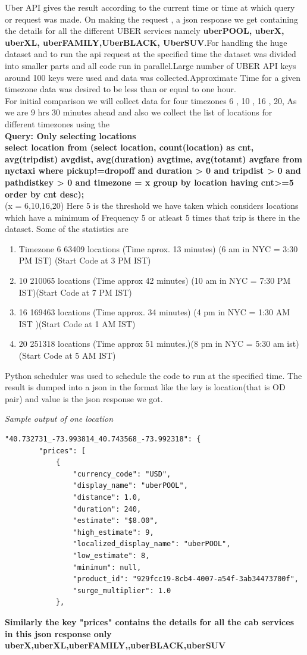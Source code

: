 \documentclass{article}
\begin{document}
Uber API gives the result according to the current time or time at which query or request was made.
On making the request , a json response we get containing the details for all the different UBER services
namely \textbf{uberPOOL, uberX, uberXL, uberFAMILY,UberBLACK, UberSUV}.For handling the huge dataset and to run the api request at the specified time the dataset was divided into smaller parts and all code run in parallel.Large number of UBER API keys around 100 keys were used and data was collected.Approximate Time for a given timezone data was desired to be less than or equal to one hour. 
\\For initial comparison we will collect data for four timezones 6  , 10 , 16 , 20, 
As we are 9 hrs 30 minutes ahead and also we collect the list of locations for different timezones
using the 
\textbf{\\Query: Only selecting locations
\\select location from (select location, count(location) as cnt, avg(tripdist) avgdist, avg(duration) avgtime, avg(totamt) avgfare from nyctaxi where pickup!=dropoff and duration > 0 and tripdist > 0 and pathdistkey > 0 and timezone = x group by location  having cnt>=5  order by cnt desc);}
\\(x = 6,10,16,20)
Here 5 is the threshold we have taken which considers locations which have a minimum of Frequency 5 or atleast 5 times that trip is there in the dataset. 
Some of the statistics are 
\begin{enumerate}
\item Timezone 6
63409 locations   (Time aprox. 13 minutes)  (6 am in NYC =  3:30 PM IST) (Start Code at 3 PM IST)
\item 10
210065 locations  (Time approx  42 minutes) (10 am in NYC = 7:30 PM IST)(Start Code at 7 PM IST)
\item 16
169463 locations (Time approx. 34 minutes) (4 pm in NYC = 1:30 AM IST )(Start Code at 1 AM IST)
\item 20
251318 locations (Time approx 51 minutes.)(8 pm in NYC = 5:30 am ist)(Start Code at 5 AM IST)
\end{enumerate}
Python scheduler was used to schedule the code to run at the specified time.
The result is dumped into a json in the format like the key is location(that is OD pair) and value is the json response we got.


\noindent
{\it Sample output of one location}
\begin{verbatim}
"40.732731_-73.993814_40.743568_-73.992318": {
        "prices": [
            {
                "currency_code": "USD",
                "display_name": "uberPOOL",
                "distance": 1.0,
                "duration": 240,
                "estimate": "$8.00",
                "high_estimate": 9,
                "localized_display_name": "uberPOOL",
                "low_estimate": 8,
                "minimum": null,
                "product_id": "929fcc19-8cb4-4007-a54f-3ab34473700f",
                "surge_multiplier": 1.0
            },
\end{verbatim}
\textbf{Similarly the key "prices" contains the details for all the cab services in this json response only 
uberX,uberXL,uberFAMILY,,uberBLACK,uberSUV}
\end{document}
